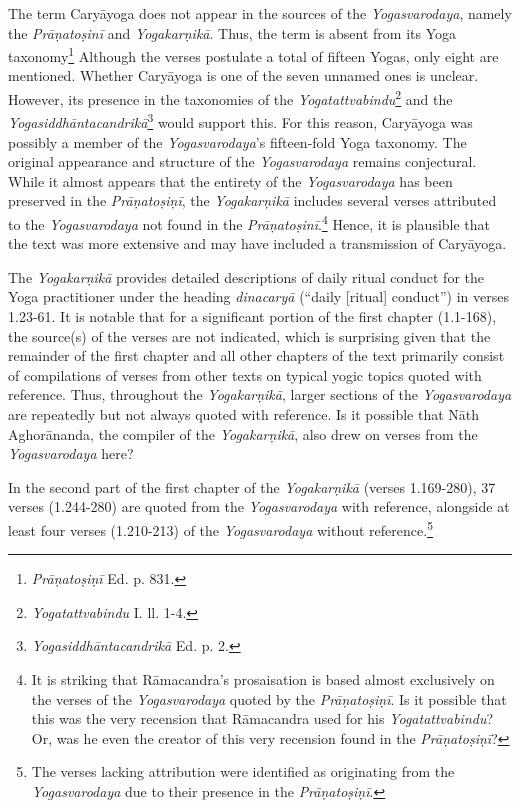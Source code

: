 The term Caryāyoga does not appear in the sources of the \textit{Yogasvarodaya}, namely the \textit{Prāṇatoṣinī} and \textit{Yogakarṇikā}. Thus, the term is absent from its Yoga taxonomy\footnote{\textit{Prāṇatoṣiṇī} Ed. p. 831.} Although the verses postulate a total of fifteen Yogas, only eight are mentioned. Whether Caryāyoga is one of the seven unnamed ones is unclear. However, its presence in the taxonomies of the \textit{Yogatattvabindu}\footnote{\textit{Yogatattvabindu} I. ll. 1-4.} and the \textit{Yogasiddhāntacandrikā}\footnote{\textit{Yogasiddhāntacandrikā} Ed. p. 2.} would support this. For this reason, Caryāyoga was possibly a member of the \textit{Yogasvarodaya}'s fifteen-fold Yoga taxonomy. The original appearance and structure of the \textit{Yogasvarodaya} remains conjectural. While it almost appears that the entirety of the \textit{Yogasvarodaya} has been preserved in the \textit{Prāṇatoṣiṇī}, the \textit{Yogakarṇikā} includes several verses attributed to the \textit{Yogasvarodaya} not found in the \textit{Prāṇatoṣinī}.\footnote{It is striking that Rāmacandra's prosaisation is based almost exclusively on the verses of the \textit{Yogasvarodaya} quoted by the \textit{Prāṇatoṣiṇī}. Is it possible that this was the very recension that Rāmacandra used for his \emph{Yogatattvabindu}? Or, was he even the creator of this very recension found in the \textit{Prāṇatoṣiṇī}?} Hence, it is plausible that the text was more extensive and may have included a transmission of Caryāyoga.

The \textit{Yogakarṇikā} provides detailed descriptions of daily ritual conduct for the Yoga practitioner under the heading \textit{dinacaryā} (``daily [ritual] conduct'') in verses 1.23-61. It is notable that for a significant portion of the first chapter (1.1-168), the source(s) of the verses are not indicated, which is surprising given that the remainder of the first chapter and all other chapters of the text primarily consist of compilations of verses from other texts on typical yogic topics quoted with reference. Thus, throughout the \textit{Yogakarṇikā}, larger sections of the \textit{Yogasvarodaya} are repeatedly but not always quoted with reference. Is it possible that Nāth Aghorānanda, the compiler of the \textit{Yogakarṇikā}, also drew on verses from the \textit{Yogasvarodaya} here?

In the second part of the first chapter of the \textit{Yogakarṇikā} (verses 1.169-280), 37 verses (1.244-280) are quoted from the \textit{Yogasvarodaya} with reference, alongside at least four verses (1.210-213) of the \textit{Yogasvarodaya} without reference.\footnote{The verses lacking attribution were identified as originating from the \textit{Yogasvarodaya} due to their presence in the \textit{Prāṇatoṣiṇī}.}

